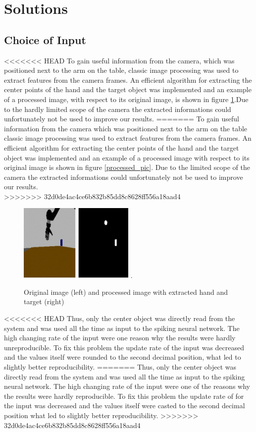 \section{Solutions}
\subsection{Choice of Input}

<<<<<<< HEAD
To gain useful information from the camera, which was positioned next to the arm on the table, classic image processing was used to extract features from the camera frames. An efficient algorithm for extracting the center points of the hand and the target object was implemented and an example of a processed image, with respect to its original image, is shown in figure \ref{fig:processed_pic}.Due to the hardly limited scope of the camera the extracted informations could unfortunately not be used to improve our results.
=======
To gain useful information from the camera which was positioned next to the arm on the table classic image processing was used to extract features from the camera frames. An efficient algorithm for extracting the center points of the hand and the target object was implemented and an example of a processed image with respect to its original image is shown in figure \ref{processed_pic}. Due to the limited scope of the camera the extracted informations could unfortunately not be used to improve our results.\\
>>>>>>> 32d0de4ac4ce6b832b85dd8c8628ff556a18aad4

\begin{figure}[H]
	\centering
	\includegraphics[width=2.2in]{img/image_processing.png}
	\DeclareGraphicsExtensions.
	\caption{Original image (left) and processed image with extracted hand and target (right)}
	\label{fig:processed_pic}
\end{figure}

<<<<<<< HEAD
Thus, only the center object was directly read from the system and was used all the time as input to the spiking neural network. The high changing rate of the input were one reason why the results were hardly unreproducible. To fix this problem the update rate of the input was decreased and the values itself were rounded to the second decimal position, what led to slightly better reproducibility. 
=======
Thus, only the center object was directly read from the system and was used all the time as input to the spiking neural network. The high changing rate of the input were one of the reasons why the results were hardly reproducible. To fix this problem the update rate of for the input was decreased and the values itself were casted to the second decimal position what led to slightly better reproducibility. 
>>>>>>> 32d0de4ac4ce6b832b85dd8c8628ff556a18aad4

